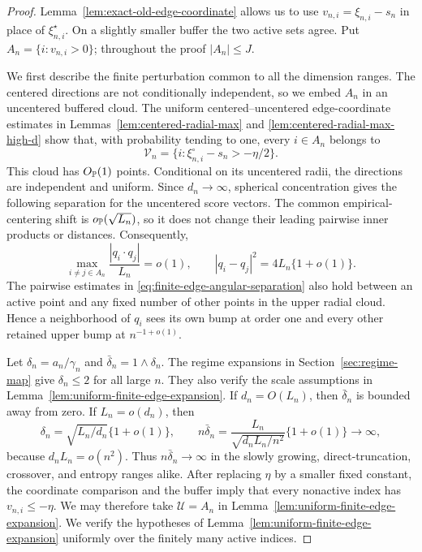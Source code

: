 \begin{proof}
Lemma~\ref{lem:exact-old-edge-coordinate} allows us to use
\(v_{n,i}=\xi_{n,i}-s_n\) in place of \(\xi_{n,i}^\star\).  On a slightly
smaller buffer the two active sets agree.  Put
\(A_n=\{i:v_{n,i}>0\}\); throughout the proof \(|A_n|\le J\).

We first describe the finite perturbation common to all the dimension
ranges.  The centered directions are not conditionally independent, so we
embed \(A_n\) in an uncentered buffered cloud.  The uniform
centered--uncentered edge-coordinate estimates in
Lemmas~\ref{lem:centered-radial-max} and
\ref{lem:centered-radial-max-high-d} show that, with probability tending
to one, every \(i\in A_n\) belongs to
\[
 \mathcal V_n=\{i:\xi_{n,i}^\circ-s_n>-\eta/2\}.
\]
This cloud has \(O_{\mathbb P}(1)\) points. Conditional on its uncentered
radii, the directions are independent and uniform. Since \(d_n\to\infty\),
spherical concentration gives the following separation for the
uncentered score vectors. The common empirical-centering shift is
\(o_{\mathbb P}(\sqrt{L_n})\), so it does not change their leading pairwise inner
products or distances. Consequently,
\begin{equation}
\label{eq:finite-edge-angular-separation}
 \max_{i\ne j\in A_n}
 \frac{|q_i\cdot q_j|}{L_n}=o(1),
 \qquad
 |q_i-q_j|^2=4L_n\{1+o(1)\}.
\end{equation}
The pairwise estimates in \eqref{eq:finite-edge-angular-separation} also hold
between an active point and any fixed number of other points in the upper
radial cloud.  Hence a neighborhood of \(q_i\)
sees its own bump at order one and every other retained upper bump at
\(n^{-1+o(1)}\).

Let \(\delta_n=a_n/\gamma_n\) and
\(\bar\delta_n=1\wedge\delta_n\).  The regime expansions in
Section~\ref{sec:regime-map} give \(\delta_n\le2\) for all large \(n\).
They also verify the scale assumptions in
Lemma~\ref{lem:uniform-finite-edge-expansion}. If
\(d_n=O(L_n)\), then \(\bar\delta_n\) is bounded away from zero.  If
\(L_n=o(d_n)\), then
\[
 \delta_n=\sqrt{L_n/d_n}\{1+o(1)\},
 \qquad
 n\bar\delta_n
 =\frac{L_n}{\sqrt{d_nL_n/n^2}}\{1+o(1)\}\longrightarrow\infty,
\]
because \(d_nL_n=o(n^2)\).  Thus
\(n\bar\delta_n\to\infty\) in the slowly growing, direct-truncation,
crossover, and entropy ranges alike.
After replacing \(\eta\) by a smaller fixed constant, the coordinate
comparison and the buffer imply that every nonactive index has
\(v_{n,i}\le-\eta\).  We may therefore take \(\mathcal U=A_n\) in
Lemma~\ref{lem:uniform-finite-edge-expansion}.
We verify the hypotheses of
Lemma~\ref{lem:uniform-finite-edge-expansion} uniformly over the finitely
many active indices.


\end{proof}
